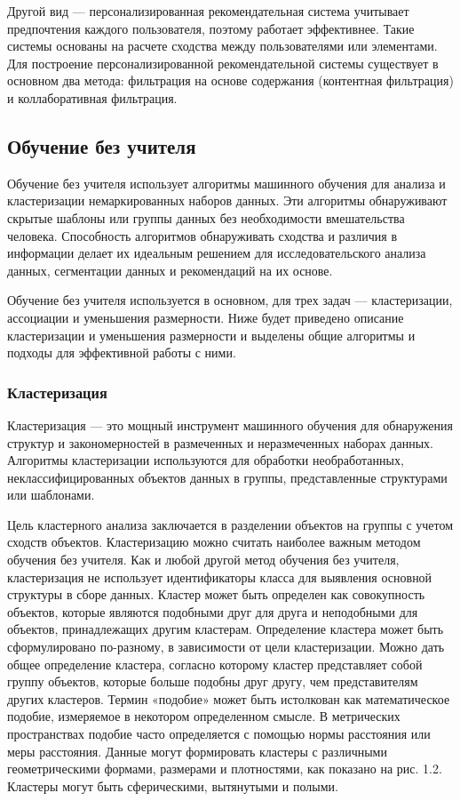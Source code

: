 Другой вид — персонализированная рекомендательная система учитывает предпочтения каждого пользователя, поэтому работает эффективнее. Такие системы основаны на расчете сходства между пользователями или элементами. Для построение персонализированной рекомендательной системы существует в основном два метода: фильтрация на основе содержания (контентная фильтрация) и коллаборативная фильтрация. \cite{RecSys}

\subsection{Обучение без учителя}

Обучение без учителя использует алгоритмы машинного обучения для анализа и кластеризации немаркированных наборов данных. Эти алгоритмы обнаруживают скрытые шаблоны или группы данных без необходимости вмешательства человека. Способность алгоритмов обнаруживать сходства и различия в информации делает их идеальным решением для исследовательского анализа данных, сегментации данных и рекомендаций на их основе. 

Обучение без учителя используется в основном, для трех задач --- кластеризации, ассоциации и уменьшения размерности. Ниже будет приведено описание кластеризации и уменьшения размерности и выделены общие алгоритмы и подходы для эффективной работы с ними.

\subsubsection{Кластеризация}
Кластеризация --- это мощный инструмент машинного обучения для обнаружения структур и закономерностей в размеченных и неразмеченных наборах данных. Алгоритмы кластеризации используются для обработки необработанных, неклассифицированных объектов данных в группы, представленные структурами или шаблонами.

Цель кластерного анализа заключается в разделении объектов на группы
с учетом сходств объектов. Кластеризацию можно считать наиболее важным
методом обучения без учителя. Как и любой другой метод обучения без
учителя, кластеризация не использует идентификаторы класса для выявления
основной структуры в сборе данных. Кластер может быть определен как
совокупность объектов, которые являются подобными друг для друга и
неподобными для объектов, принадлежащих другим кластерам. Определение
кластера может быть сформулировано по-разному, в зависимости от цели
кластеризации. Можно дать общее определение кластера, согласно которому
кластер представляет собой группу объектов, которые больше подобны друг
другу, чем представителям других кластеров. Термин «подобие» может быть
истолкован как математическое подобие, измеряемое в некотором
определенном смысле. В метрических пространствах подобие часто
определяется с помощью нормы расстояния или меры расстояния. Данные
могут формировать кластеры с различными геометрическими формами,
размерами и плотностями, как показано на рис. 1.2. Кластеры могут быть
сферическими, вытянутыми и полыми.

